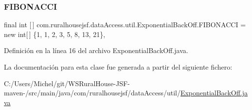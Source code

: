 \subsubsection{\texorpdfstring{FIBONACCI}{FIBONACCI}}
{\footnotesize\ttfamily final int \mbox{[}$\,$\mbox{]} com.\+ruralhousejsf.\+data\+Access.\+util.\+Exponential\+Back\+Off.\+F\+I\+B\+O\+N\+A\+C\+CI = new int\mbox{[}$\,$\mbox{]} \{1, 1, 2, 3, 5, 8, 13, 21\}\hspace{0.3cm}{\ttfamily [static]}, {\ttfamily [private]}}



Definición en la línea 16 del archivo Exponential\+Back\+Off.\+java.



La documentación para esta clase fue generada a partir del siguiente fichero\+:\begin{DoxyCompactItemize}
\item 
C\+:/\+Users/\+Michel/git/\+W\+S\+Rural\+House-\/\+J\+S\+F-\/maven-\//src/main/java/com/ruralhousejsf/data\+Access/util/\mbox{\hyperlink{_exponential_back_off_8java}{Exponential\+Back\+Off.\+java}}\end{DoxyCompactItemize}
